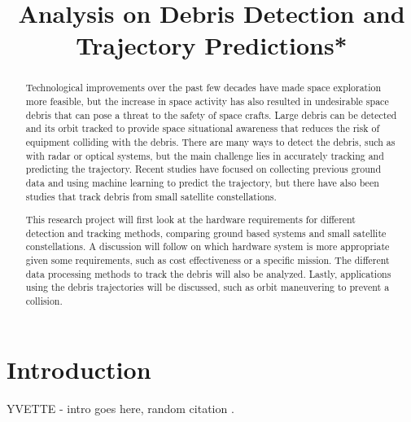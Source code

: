 \documentclass[conference]{IEEEtran}
\begin{document}
	
	\title{Analysis on Debris Detection and Trajectory Predictions*}
	\author{
	}
	\maketitle
	
	\begin{abstract}
		  
		Technological improvements over the past few decades have made space exploration more feasible, but the increase in space activity has also resulted in undesirable space debris that can pose a threat to the safety of space crafts. Large debris can be detected and its orbit tracked to provide space situational awareness that reduces the risk of equipment colliding with the debris. There are many ways to detect the debris, such as with radar or optical systems, but the main challenge lies in accurately tracking and predicting the trajectory. Recent studies have focused on collecting previous ground data and using machine learning to predict the trajectory, but there have also been studies that track debris from small satellite constellations. \
		
		This research project will first look at the hardware requirements for different detection and tracking methods, comparing ground based systems and small satellite constellations. A discussion will follow on which hardware system is more appropriate given some requirements, such as cost effectiveness or a specific mission. The different data processing methods to track the debris will also be analyzed. Lastly, applications using the debris trajectories will be discussed, such as orbit maneuvering to prevent a collision.\cite{2013_orbit_pred}

	\end{abstract}

	\section{Introduction}
	
	YVETTE - intro goes here, random citation \cite{2019_lidar}.


	\nocite{*}
	\printbibliography
	
\end{document}
